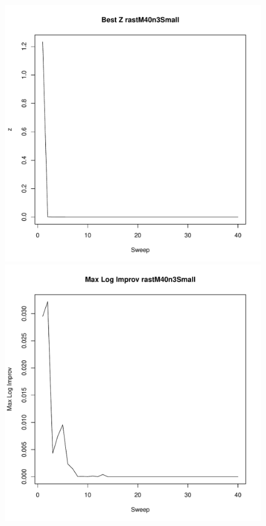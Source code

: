\documentclass{article}
\begin{document}
\begin{figure}
        \begin{center}
                \begin{minipage}[h!]{0.49\textwidth}
                        \includegraphics[width=1.0\textwidth]{rastM40n3SmallCoord.pdf}
                \end{minipage}
                \begin{minipage}[h!]{0.49\textwidth}
                        \includegraphics[width=1.0\textwidth]{rastM40n3SmallMLI.pdf}
                \end{minipage}
        \end{center}
\end{figure}
\end{document}
